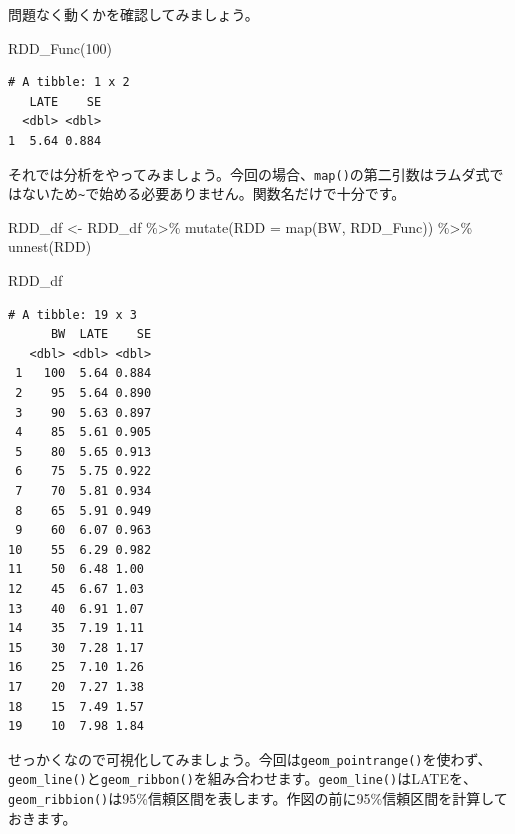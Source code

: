 \documentclass[
  a4paper,
  pandoc,
  ja=standard,
  jafont=haranoaji]{bxjsbook}
\newenvironment{Shaded}{\begin{snugshade}}{\end{snugshade}}
\newcommand{\AttributeTok}[1]{\textcolor[rgb]{0.00,0.48,0.65}{#1}}
\newcommand{\DecValTok}[1]{\textcolor[rgb]{0.68,0.00,0.00}{#1}}
\newcommand{\FunctionTok}[1]{\textcolor[rgb]{0.28,0.35,0.67}{#1}}
\newcommand{\NormalTok}[1]{\textcolor[rgb]{0.00,0.48,0.65}{#1}}
\newcommand{\OtherTok}[1]{\textcolor[rgb]{0.00,0.48,0.65}{#1}}
\newcommand{\SpecialCharTok}[1]{\textcolor[rgb]{0.37,0.37,0.37}{#1}}
\begin{document}
問題なく動くかを確認してみましょう。

\begin{Shaded}
\begin{Highlighting}[numbers=left,,]
\FunctionTok{RDD\_Func}\NormalTok{(}\DecValTok{100}\NormalTok{)}
\end{Highlighting}
\end{Shaded}

\begin{verbatim}
# A tibble: 1 x 2
   LATE    SE
  <dbl> <dbl>
1  5.64 0.884
\end{verbatim}

それでは分析をやってみましょう。今回の場合、\texttt{map()}の第二引数はラムダ式ではないため\texttt{\textasciitilde{}}で始める必要ありません。関数名だけで十分です。

\begin{Shaded}
\begin{Highlighting}[numbers=left,,]
\NormalTok{RDD\_df }\OtherTok{\textless{}{-}}\NormalTok{ RDD\_df }\SpecialCharTok{\%\textgreater{}\%}
  \FunctionTok{mutate}\NormalTok{(}\AttributeTok{RDD  =} \FunctionTok{map}\NormalTok{(BW, RDD\_Func)) }\SpecialCharTok{\%\textgreater{}\%}
  \FunctionTok{unnest}\NormalTok{(RDD)}

\NormalTok{RDD\_df}
\end{Highlighting}
\end{Shaded}

\begin{verbatim}
# A tibble: 19 x 3
      BW  LATE    SE
   <dbl> <dbl> <dbl>
 1   100  5.64 0.884
 2    95  5.64 0.890
 3    90  5.63 0.897
 4    85  5.61 0.905
 5    80  5.65 0.913
 6    75  5.75 0.922
 7    70  5.81 0.934
 8    65  5.91 0.949
 9    60  6.07 0.963
10    55  6.29 0.982
11    50  6.48 1.00 
12    45  6.67 1.03 
13    40  6.91 1.07 
14    35  7.19 1.11 
15    30  7.28 1.17 
16    25  7.10 1.26 
17    20  7.27 1.38 
18    15  7.49 1.57 
19    10  7.98 1.84 
\end{verbatim}

せっかくなので可視化してみましょう。今回は\texttt{geom\_pointrange()}を使わず、\texttt{geom\_line()}と\texttt{geom\_ribbon()}を組み合わせます。\texttt{geom\_line()}はLATEを、\texttt{geom\_ribbion()}は95\%信頼区間を表します。作図の前に95\%信頼区間を計算しておきます。
\end{document}
